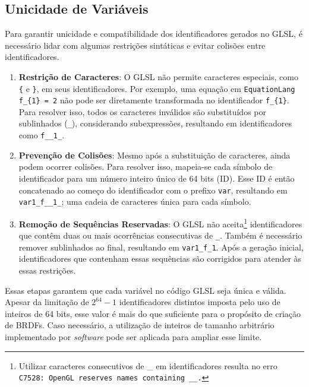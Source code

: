 \subsection{Unicidade de Variáveis} \label{sec-unicidade}

Para garantir unicidade e compatibilidade dos identificadores gerados no GLSL, é necessário lidar com algumas restrições sintáticas e evitar colisões entre identificadores.

\begin{enumerate}
    \item \textbf{Restrição de Caracteres}: O GLSL não permite caracteres especiais, como \verb"{" e \verb"}", em seus identificadores. Por exemplo, uma equação em \texttt{EquationLang} \verb "f_{1} = 2" não pode ser diretamente transformada no identificador \verb`f_{1}`. Para resolver isso, todos os caracteres inválidos são substituídos por sublinhados (\verb`_`), considerando subexpressões, resultando em identificadores como \verb`f__1_`.

    \item \textbf{Prevenção de Colisões}: Mesmo após a substituição de caracteres, ainda podem ocorrer colisões. Para resolver isso, mapeia-se cada símbolo de identificador para um número inteiro único de 64 bits (ID). Esse ID é então concatenado ao começo do identificador com o prefixo \verb"var", resultando em \verb"var1_f__1_"; uma cadeia de caracteres única para cada símbolo.

    \item \textbf{Remoção de Sequências Reservadas}: O GLSL não aceita\footnote{Utilizar caracteres consecutivos de \_ em identificadores resulta no erro \texttt{C7528: OpenGL reserves names containing \_\_.}} identificadores que contêm duas ou mais ocorrências consecutivas de \verb`_`.
     Também é necessário remover sublinhados ao final, resultando em \verb`var1_f_1`. Após a geração inicial, identificadores que contenham essas sequências são corrigidos para atender às essas restrições.
\end{enumerate}


Essas etapas garantem que cada variável no código GLSL seja única e válida. Apesar da limitação de $2^{64} - 1$ identificadores distintos imposta pelo uso de inteiros de 64 bits, esse valor é mais do que suficiente para o propósito de criação de BRDFs. Caso necessário, a utilização de inteiros de tamanho arbitrário implementado por \textit{software} pode ser aplicada para ampliar esse limite.



